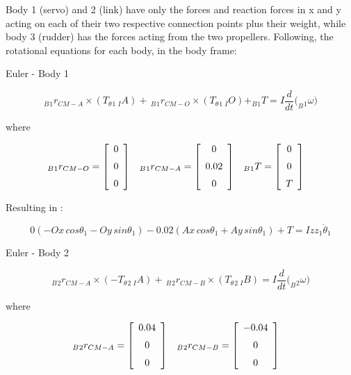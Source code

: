 Body 1 (servo) and 2 (link) have only the forces and reaction forces in x and y acting on each of their two respective connection points plus their weight, while body 3 (rudder) has the forces acting from the two propellers. 
Following, the rotational equations for each body, in the body frame:

Euler - Body 1 

\begin{equation}\label{euler1}
	_B{_1}{r}_{CM-A}\times (T_\theta{_1} \, {_I}{A}) + \,_B{_1}{r}_{CM-O} \times (T_\theta{_1} \, {_I}{O}) + _B{_1}{T} = I  \frac{d}{dt}(_B{_1}{\omega)}
\end{equation}


where

\begin{align*}
_B{_1}{r}_{CM-O} &= \left[ \begin {array}{c} 0\\ \noalign{\medskip}0\\ \noalign{\medskip}0
\end {array} \right] &
_B{_1}{r}_{CM-A} &= \left[ \begin {array}{c} 0\\ \noalign{\medskip}0.02\\ \noalign{\medskip}0
\end {array} \right]&
_B{_1}{T} &= \left[ \begin {array}{c} 0\\ \noalign{\medskip}0\\ \noalign{\medskip}T
\end {array} \right]&
\end{align*}

Resulting in :

\begin{equation}\label{euler1end}
	0(-Ox\,cos\theta_{{1}} - Oy\,sin\theta_{{1}}) - 0.02(Ax\,cos\theta_{{1}} + Ay\,sin\theta_{{1}}) + T = Izz_{{1}}\ddot\theta_{{1}}
\end{equation}

Euler - Body 2 

\begin{equation}\label{euler2}
	_B{_2}{r}_{CM-A}\times (-T_\theta{_2} \, {_I}{A}) + \,_B{_2}{r}_{CM-B} \times (T_\theta{_2} \, {_I}{B}) = I  \frac{d}{dt}(_B{_2}{\omega)}
\end{equation}

where

\begin{align*}
_B{_2}{r}_{CM-A} &= \left[ \begin {array}{c} 0.04\\ \noalign{\medskip}0\\ \noalign{\medskip}0
\end {array} \right] &
_B{_2}{r}_{CM-B} &= \left[ \begin {array}{c} -0.04\\ \noalign{\medskip}0\\ \noalign{\medskip}0
\end {array} \right]&
\end{align*}

